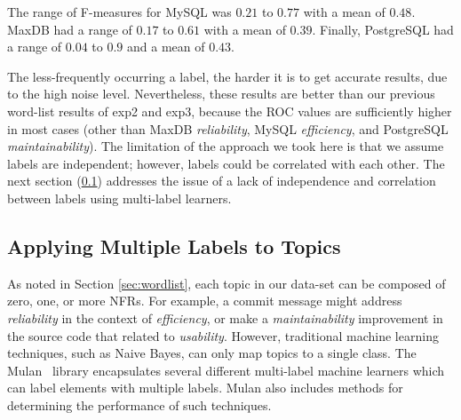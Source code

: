 \documentclass[smallextended]{svjour3}       %
\begin{document}

The range of F-measures for MySQL was $0.21$ to $0.77$ with a mean
of $0.48$. MaxDB had a range of $0.17$ to $0.61$ with a mean
of $0.39$. Finally, PostgreSQL had a range of $0.04$ to $0.9$ and a mean of $0.43$.


The less-frequently occurring a label, the harder it is to get accurate
results, due to the high noise level. Nevertheless, these results are
better than our previous word-list results of \textsf{exp2} and
\textsf{exp3}, because the ROC values are sufficiently higher in most
cases (other than MaxDB \emph{reliability}, MySQL \emph{efficiency}, and PostgreSQL \emph{maintainability}). The
limitation of the approach we took here is that we assume labels are
independent; however, labels could be correlated with each other. 
The next section (\ref{sec:multilabel})
addresses the issue of a lack of independence and correlation between
labels
using multi-label learners.


\subsection{Applying Multiple Labels to Topics}
\label{sec:multilabel}

As noted in Section \ref{sec:wordlist}, each topic in our data-set can be composed of zero, one, or more NFRs. 
For example, a commit message might address \textit{reliability} in the context of \textit{efficiency}, or make a \textit{maintainability} improvement
in the source code that related to \textit{usability}. 
However, traditional machine learning techniques, such as Naive Bayes, can only map topics to a single class. 
The Mulan~\cite{mulan} library encapsulates several different multi-label machine learners which can label elements with multiple labels.
Mulan also includes methods for determining the performance of such techniques.
\end{document}
